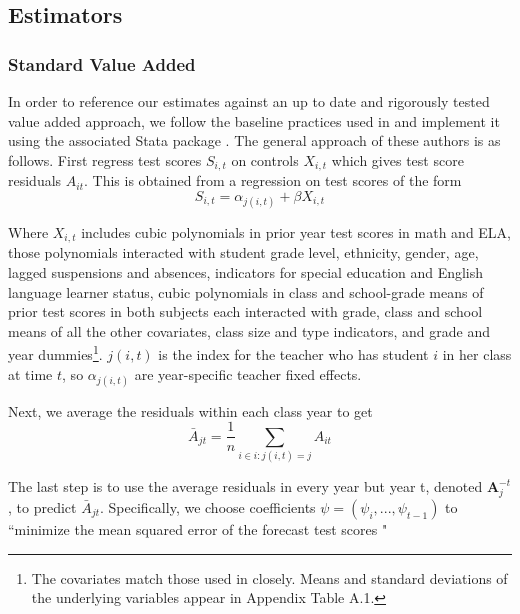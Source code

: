 \documentclass[12pt]{article}
\theoremstyle{definition}
\theoremstyle{definition}
\theoremstyle{definition}
\theoremstyle{definition}
\begin{document}
    \subsection{Estimators}
    \subsubsection{Standard Value Added}

    In order to reference our estimates against an up to date and rigorously tested value added approach, we follow the baseline practices used in \citet{chetty2014measuring1} and implement it using the associated Stata package \cite{stepner2013}. The general approach of these authors is as follows. First regress test scores $S_{i,t}$ on controls $X_{i, t}$ which gives test score residuals $A_{it}$. This is obtained from a regression on test scores of the form 
    \begin{equation}
        S_{i,t} = \alpha_{j(i, t)} + \beta X_{i, t}
    \end{equation}

    Where $X_{i, t}$ includes cubic polynomials in prior year test scores in math and ELA, those polynomials interacted with student grade level, ethnicity, gender, age, lagged suspensions and absences, indicators for special education and English language learner status, cubic polynomials in class and school-grade means of prior test scores in both subjects each interacted with grade, class and school means of all the other covariates, class size and type indicators, and grade and year dummies\footnote{The covariates match those used in \citep{chetty2014measuring1} closely. Means and standard deviations of the underlying variables appear in Appendix Table A.1.}.  $j(i, t)$ is the index for the teacher who has student $i$ in her class at time $t$, so $\alpha_{j(i, t)}$ are year-specific teacher fixed effects.

    Next, we average the residuals within each class year to get 
    \begin{equation}
        \bar{A}_{jt} = \frac{1}{n} \sum_{i \in {i: j(i, t) = j}} A_{it}
    \end{equation}

    The last step is to use the average residuals in every year but year t, denoted $\mathbf{A}_j^{-t}$, to predict $\bar{A}_{jt} $. Specifically, we choose coefficients $\psi = (\psi_i, ..., \psi_{t-1})$ to ``minimize the mean squared error of the forecast test scores \citep{chetty2014measuring1}"
\end{document}
